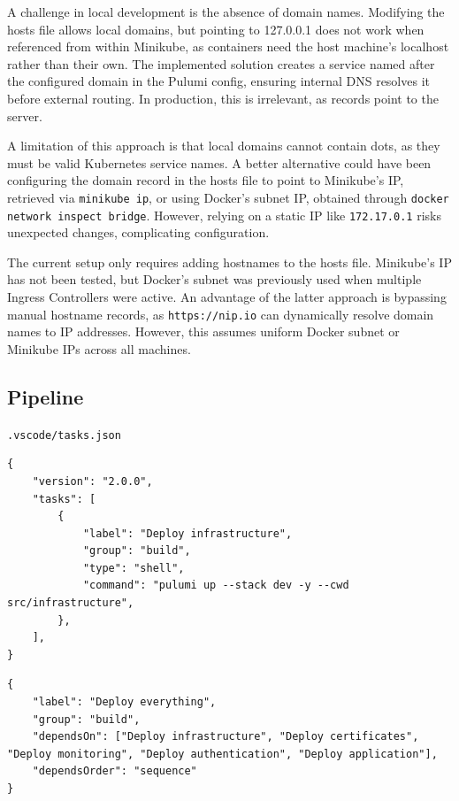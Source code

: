 A challenge in local development is the absence of domain names. Modifying the hosts file allows local domains, but pointing to 127.0.0.1 does not work when referenced from within Minikube, as containers need the host machine's localhost rather than their own. The implemented solution creates a service named after the configured domain in the Pulumi config, ensuring internal DNS resolves it before external routing. In production, this is irrelevant, as records point to the server.

A limitation of this approach is that local domains cannot contain dots, as they must be valid Kubernetes service names. A better alternative could have been configuring the domain record in the hosts file to point to Minikube's IP, retrieved via \texttt{minikube ip}, or using Docker's subnet IP, obtained through \texttt{docker network inspect bridge}. However, relying on a static IP like \texttt{172.17.0.1} risks unexpected changes, complicating configuration.

The current setup only requires adding hostnames to the hosts file. Minikube's IP has not been tested, but Docker's subnet was previously used when multiple Ingress Controllers were active. An advantage of the latter approach is bypassing manual hostname records, as \texttt{https://nip.io} can dynamically resolve domain names to IP addresses. However, this assumes uniform Docker subnet or Minikube IPs across all machines.


\subsection{Pipeline}

\texttt{.vscode/tasks.json}

\begin{verbatim}
{
    "version": "2.0.0",
    "tasks": [
        {
            "label": "Deploy infrastructure",
            "group": "build",
            "type": "shell",
            "command": "pulumi up --stack dev -y --cwd src/infrastructure",
        },
    ],
}
\end{verbatim}

\begin{verbatim}
{
    "label": "Deploy everything",
    "group": "build",
    "dependsOn": ["Deploy infrastructure", "Deploy certificates", "Deploy monitoring", "Deploy authentication", "Deploy application"],
    "dependsOrder": "sequence"
}
\end{verbatim}

